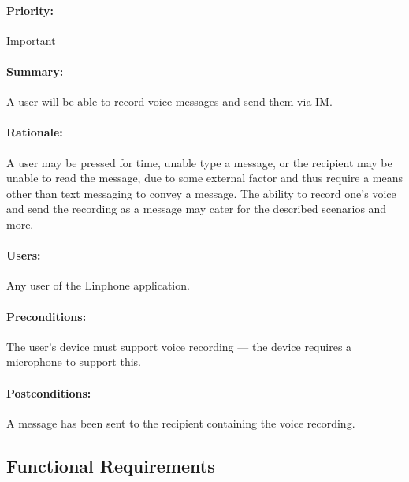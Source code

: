 \documentclass[11pt]{article}
\begin{document}
\paragraph{Priority:} Important
\paragraph{Summary:} A user will be able to record voice messages and send them via IM.
\paragraph{Rationale:} A user may be pressed for time, unable type a message, or the recipient may be unable to read the message, due to some external factor and thus require a means other than text messaging to convey a message. The ability to record one's voice and send the recording as a message may cater for the described scenarios and more.
\paragraph{Users:} Any user of the Linphone application.
\paragraph{Preconditions:} The user's device must support voice recording --- the device requires a microphone to support this.
\paragraph{{Postconditions:}} A message has been sent to the recipient containing the voice recording.

\subsection{Functional Requirements}
\end{document}
